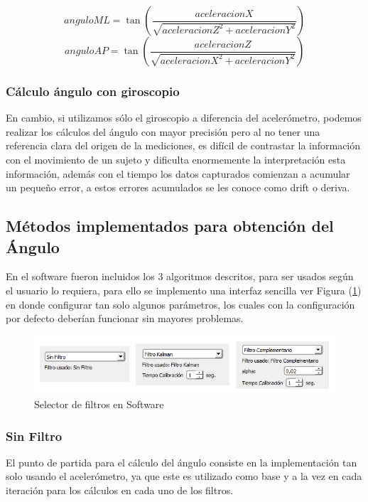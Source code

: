 \documentclass[12pt,a4paper]{article}
\begin{document}
\begin{figure}[H]
	\begin{equation}
	anguloML = \tan{\left(\frac{aceleracionX}{\sqrt{aceleracionZ^{2}+aceleracionY^{2}}}\right)}
	\label{eq:calculoanguloXsensorvertical}
	\end{equation}
	\begin{equation}
	anguloAP = \tan{\left(\frac{aceleracionZ}{\sqrt{aceleracionX^{2}+aceleracionY^{2}}}\right)}
	\label{eq:calculoanguloYsensorvertical}
	\end{equation}
\end{figure}

\subsubsection{Cálculo ángulo con giroscopio} 
En cambio, si utilizamos sólo el giroscopio a diferencia del acelerómetro, podemos realizar los cálculos del ángulo con mayor precisión pero al no tener una referencia clara del origen de la mediciones, es difícil de contrastar la información con el movimiento de un sujeto y dificulta enormemente la  interpretación esta información, además con el tiempo los datos capturados comienzan a acumular un pequeño error, a estos errores acumulados se les conoce como drift o deriva.

\newpage
\subsection{Métodos implementados para obtención del Ángulo}
En el software fueron incluidos los 3 algoritmos descritos, para ser usados según el usuario lo requiera, para ello se implemento una interfaz sencilla ver Figura (\ref{fig:selectorFiltros}) en donde configurar tan solo algunos parámetros, los cuales con la configuración por defecto deberían funcionar sin mayores problemas.

\begin{figure}[H]
	\centering
	\includegraphics[scale=0.9]{images/implementacionFiltros}
	\caption{Selector de filtros en Software}
	\label{fig:selectorFiltros}
\end{figure}


\subsubsection{Sin Filtro} El punto de partida para el cálculo del ángulo consiste en la implementación tan solo usando el acelerómetro, ya que este es utilizado como base y a la vez en cada iteración para los cálculos en cada uno de los filtros.
\end{document}
